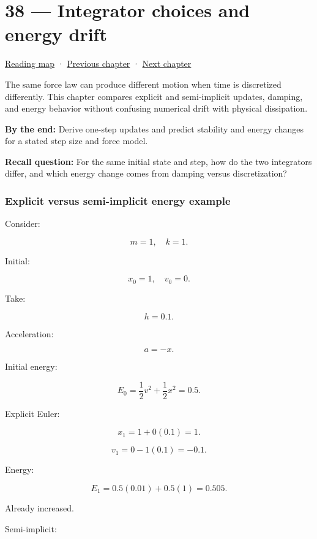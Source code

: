 \hypertarget{06-engine-ii-ch038}{}
\chapter{38 --- Integrator choices and energy drift}\label{06-engine-ii-ch038-integrator-choices-and-energy-drift}

\hyperref[volume-reading-map]{Reading map} · \hyperref[06-engine-ii-ch037-physical-examples-and-state-validation]{Previous chapter} · \hyperref[06-engine-ii-ch039-composable-timesteps-and-stable-simulation-policy]{Next chapter}

The same force law can produce different motion when time is discretized differently. This chapter compares explicit and semi-implicit updates, damping, and energy behavior without confusing numerical drift with physical dissipation.

\textbf{By the end:} Derive one-step updates and predict stability and energy changes for a stated step size and force model.

\textbf{Recall question:} For the same initial state and step, how do the two integrators differ, and which energy change comes from damping versus discretization?

\subsection{Explicit versus semi-implicit energy example}\label{06-engine-ii-ch038-explicit-versus-semi-implicit-energy-example}

Consider:

\[
m=1,\quad k=1.
\]

Initial:

\[
x_0=1,\quad v_0=0.
\]

Take:

\[
h=0.1.
\]

Acceleration:

\[
a=-x.
\]

Initial energy:

\[
E_0
=
\frac12v^2+
\frac12x^2
=
0.5.
\]

Explicit Euler:

\[
x_1=1+0(0.1)=1.
\]

\[
v_1=0-1(0.1)=-0.1.
\]

Energy:

\[
E_1
=
0.5(0.01)
+
0.5(1)
=
0.505.
\]

Already increased.

Semi-implicit:

